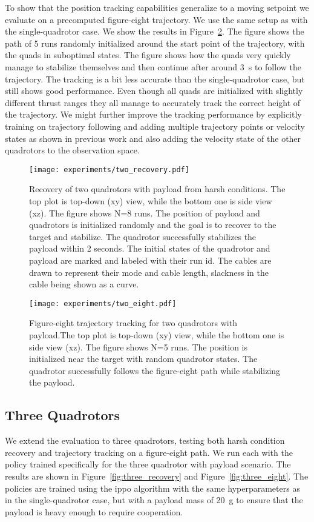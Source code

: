 To show that the position tracking capabilities generalize to a moving setpoint we evaluate on a precomputed figure-eight trajectory. We use the same setup as with the single-quadrotor case. We show the results in Figure~\ref{fig:two_eight}. The figure shows the path of 5 runs randomly initialized around the start point of the trajectory, with the quads in suboptimal states. The figure shows how the quads very quickly manage to stabilize themselves and then continue after around 3~s to follow the trajectory. The tracking is a bit less accurate than the single-quadrotor case, but still shows good performance. Even though all quads are initialized with slightly different thrust ranges they all manage to accurately track the correct height of the trajectory. We might further improve the tracking performance by explicitly training on trajectory following and adding multiple trajectory points or velocity states as shown in previous work and also adding the velocity state of the other quadrotors to the observation space.
\begin{figure}[H]
    \centering
    \texttt{[image: experiments/two\_recovery.pdf]}
    \caption[Two Quadrotor Harsh Recovery Trajectory]{Recovery of two quadrotors with payload from harsh conditions. The top plot is top-down  (xy) view, while the bottom one is side view (xz).
    The figure shows N=8 runs. The position of payload and quadrotors is initialized randomly and the goal is to recover to the target and stabilize. The quadrotor successfully stabilizes the payload within 2 seconds. The initial states of the quadrotor and payload are marked and labeled with their run id. The cables are drawn to represent their mode and cable length, slackness in the cable being shown as a curve.}
    \label{fig:two_recovery}
\end{figure}
\begin{figure}[H]
    \centering
    
    \texttt{[image: experiments/two\_eight.pdf]}
    \caption[Two Quadrotor Figure-Eight Tracking]{Figure-eight trajectory tracking for two quadrotors with payload.The top plot is top-down  (xy) view, while the bottom one is side view (xz). The figure shows N=5 runs. The position is initialized near the target with random quadrotor states. The quadrotor successfully follows the figure-eight path while stabilizing the payload.}
    \label{fig:two_eight}
\end{figure}
\subsection{Three Quadrotors}
We extend the evaluation to three quadrotors, testing both harsh condition recovery and trajectory tracking on a figure-eight path. We run each with the policy trained specifically for the three quadrotor with payload scenario. The results are shown in Figure~\ref{fig:three_recovery} and Figure~\ref{fig:three_eight}. The policies are trained using the \gls{ippo} algorithm with the same hyperparameters as in the single-quadrotor case, but with a payload mass of 20~g to ensure that the payload is heavy enough to require cooperation.

